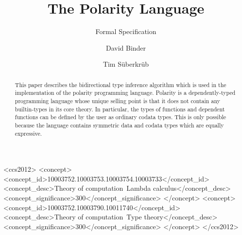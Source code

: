 \documentclass[acmsmall,nonacm]{acmart}
\begin{document}
\title{The Polarity Language}
\subtitle{Formal Specification}



\begin{CCSXML}
  <ccs2012>
  <concept>
  <concept_id>10003752.10003753.10003754.10003733</concept_id>
  <concept_desc>Theory of computation~Lambda calculus</concept_desc>
  <concept_significance>300</concept_significance>
  </concept>
  <concept>
  <concept_id>10003752.10003790.10011740</concept_id>
  <concept_desc>Theory of computation~Type theory</concept_desc>
  <concept_significance>300</concept_significance>
  </concept>
  </ccs2012>
\end{CCSXML}


\author{David Binder}


\author{Tim Süberkrüb}


\begin{abstract}
  This paper describes the bidirectional type inference algorithm which is used in the implementation of the polarity programming language.
  Polarity is a dependently-typed programming language whose unique selling point is that it does not contain any builtin-types in its core theory.
  In particular, the types of functions and dependent functions can be defined by the user as ordinary codata types.
  This is only possible because the language contains symmetric data and codata types which are equally expressive.
\end{abstract}

\maketitle
\end{document}
